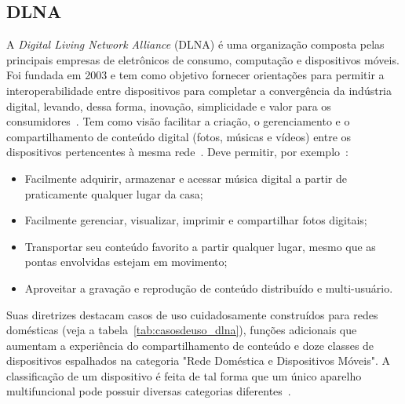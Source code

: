 \subsection{DLNA}

A \emph{Digital Living Network Alliance} (DLNA) é uma organização composta pelas principais empresas de eletrônicos de consumo, computação e dispositivos móveis. Foi fundada em 2003 e tem como objetivo fornecer orientações para permitir a interoperabilidade entre dispositivos para completar a convergência da indústria digital, levando, dessa forma, inovação, simplicidade e valor para os consumidores~\cite{dlnaoverview}. Tem como visão facilitar a criação, o gerenciamento e o compartilhamento de conteúdo digital (fotos, músicas e vídeos) entre os dispositivos pertencentes à mesma rede~\cite{dlnahdvideostreaming}. Deve permitir, por exemplo~\cite{dlnaoverview}:

\begin{itemize}
	\item Facilmente adquirir, armazenar e acessar música digital a partir de praticamente qualquer lugar da casa;
	\item Facilmente gerenciar, visualizar, imprimir e compartilhar fotos digitais;
	\item Transportar seu conteúdo favorito a partir qualquer lugar, mesmo que as pontas envolvidas estejam em movimento;
	\item Aproveitar a gravação e reprodução de conteúdo distribuído e multi-usuário.
\end{itemize}

Suas diretrizes destacam casos de uso cuidadosamente construídos para redes domésticas (veja a tabela~\ref{tab:casosdeuso_dlna}), funções adicionais que aumentam a experiência do compartilhamento de conteúdo e doze classes de dispositivos espalhados na categoria "Rede Doméstica e Dispositivos Móveis". A classificação de um dispositivo é feita de tal forma que um único aparelho multifuncional pode possuir diversas categorias diferentes~\cite{dlnahdvideostreaming}.

